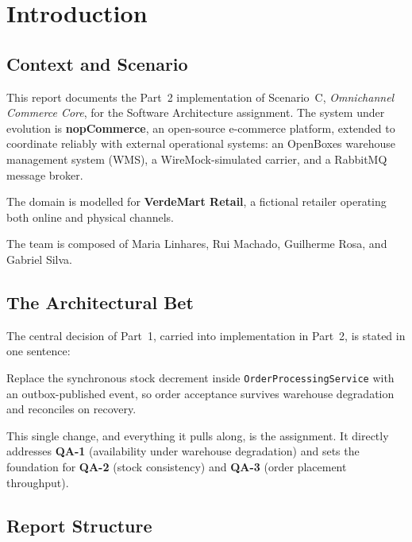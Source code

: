 \chapter{Introduction}
\label{ch:introduction}

\section{Context and Scenario}

This report documents the Part~2 implementation of Scenario~C, \textit{Omnichannel Commerce Core}, for the Software Architecture assignment. The system under evolution is \textbf{nopCommerce}, an open-source e-commerce platform, extended to coordinate reliably with external operational systems: an OpenBoxes warehouse management system (WMS), a WireMock-simulated carrier, and a RabbitMQ message broker.

The domain is modelled for \textbf{VerdeMart Retail}, a fictional retailer operating both online and physical channels.

The team is composed of Maria Linhares, Rui Machado, Guilherme Rosa, and Gabriel Silva.

\section{The Architectural Bet}

The central decision of Part~1, carried into implementation in Part~2, is stated in one sentence:

\begin{decisionbox}
Replace the synchronous stock decrement inside \texttt{OrderProcessingService} with an outbox-published event, so order acceptance survives warehouse degradation and reconciles on recovery.
\end{decisionbox}

This single change, and everything it pulls along, is the assignment. It directly addresses \textbf{QA-1} (availability under warehouse degradation) and sets the foundation for \textbf{QA-2} (stock consistency) and \textbf{QA-3} (order placement throughput).

\section{Report Structure}

